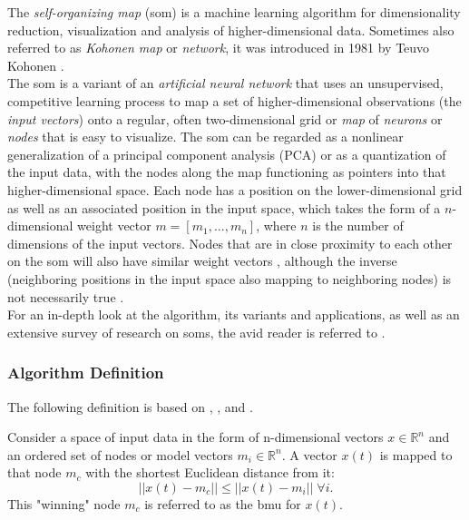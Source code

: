 The \textit{self-organizing map} (\gls{som}) is a machine learning algorithm for
dimensionality reduction, visualization and analysis of higher-dimensional data.
Sometimes also referred to as \textit{Kohonen map} or \textit{network}, it was
introduced in 1981 by Teuvo Kohonen \citep{kohonen1990}.
\\
The \gls{som} is a
variant of an \textit{artificial neural network} that uses an unsupervised,
competitive learning process to map a set of higher-dimensional observations
(the \textit{input vectors}) onto a regular, often two-dimensional grid or \textit{map}
of \textit{neurons} or \textit{nodes} that is easy to visualize.
The \gls{som} can be regarded as a nonlinear generalization of a principal
component analysis (PCA) \citep{yin2007} or as a quantization of the input data,
with the nodes along the map functioning as pointers into that
higher-dimensional space. Each node has a position on the lower-dimensional grid
as well as an associated position in the input space, which takes the form of a
$n$-dimensional weight vector $m = [m_{1}, ... , m_{n}]$, where $n$ is the
number of dimensions of the input vectors. Nodes that are in close proximity to
each other on the \gls{som} will also have similar weight vectors
\citep{vesanto2000}, although the inverse (neighboring positions in the input
space also mapping to neighboring nodes) is not necessarily true
\citep{bauer1996}.
\\
For an in-depth look at the algorithm, its variants and applications, as well as
an extensive survey of research on \glspl{som}, the avid reader is referred to
\citet{kohonen2001}.

\subsubsection{Algorithm Definition}
\label{subsubsec:som_math_definition}
The following definition is based on \citet{kohonen1990},
\citet{web:kohonen2005}, \citet{web:kohonen2007} and \citet{bauer1996}.
\bigskip

Consider a space of input data in the form of n-dimensional vectors $x \in
\mathbb{R}^n$ and an ordered set of nodes or model vectors
$m_i \in \mathbb{R}^n$. A vector $x(t)$ is mapped to that node $m_c$ with the
shortest Euclidean distance from it:
\begin{equation}
\label{eq:bmu}
  ||x(t) - m_c|| \leq ||x(t) - m_i|| \; \forall{i}.
\end{equation}
This "winning" node $m_c$ is referred to as the \gls{bmu} for $x(t)$.
\bigskip

